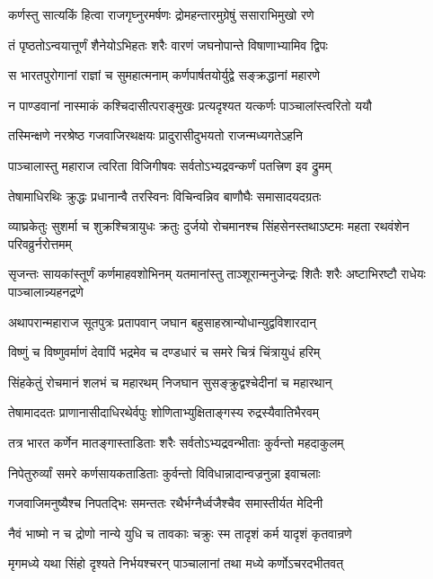 \twolineshloka
{कर्णस्तु सात्यकिं हित्वा राजगृघ्नुरमर्षणः}
{द्रोमहन्तारमुग्रेषुं ससाराभिमुखो रणे}


\twolineshloka
{तं पृष्ठतोऽन्वयात्तूर्णं शैनेयोऽभिहतः शरैः}
{वारणं जघनोपान्ते विषाणाभ्यामिव द्विपः}


\twolineshloka
{स भारतपुरोगानां राज्ञां च सुमहात्मनाम्}
{कर्णपार्षतयोर्युद्वे सङ्क्रद्धानां महारणे}


\twolineshloka
{न पाण्डवानां नास्माकं कश्चिदासीत्पराङ्मुखः}
{प्रत्यदृश्यत यत्कर्णः पाञ्चालांस्त्वरितो ययौ}


\twolineshloka
{तस्मिन्क्षणे नरश्रेष्ठ गजवाजिरथक्षयः}
{प्रादुरासीदुभयतो राजन्मध्यगतेऽहनि}


\twolineshloka
{पाञ्चालास्तु महाराज त्वरिता विजिगीषवः}
{सर्वतोऽभ्यद्रवन्कर्णं पतत्त्रिण इव द्रुमम्}


\twolineshloka
{तेषामाधिरथिः क्रुद्धः प्रधानान्वै तरस्विनः}
{विचिन्वन्निव बाणौघैः समासादयदग्रतः}


\threelineshloka
{व्याघ्रकेतुः सुशर्मा च शुक्रश्चित्रायुधः क्रतुः}
{दुर्जयो रोचमानश्च सिंहसेनस्तथाऽष्टमः}
{महता रथवंशेन परिवव्रुर्नरोत्तमम्}


\threelineshloka
{सृजन्तः सायकांस्तूर्णं कर्णमाहवशोभिनम्}
{यतमानांस्तु ताञ्शूरान्मनुजेन्द्रः शितैः शरैः}
{अष्टाभिरष्टौ राधेयः पाञ्चालान्न्यहनद्रणे}


\twolineshloka
{अथापरान्महाराज सूतपुत्रः प्रतापवान्}
{जघान बहुसाहस्रान्योधान्युद्वविशारदान्}


\twolineshloka
{विष्णुं च विष्णुवर्माणं देवापिं भद्रमेव च}
{दण्डधारं च समरे चित्रं चिंत्रायुधं हरिम्}


\twolineshloka
{सिंहकेतुं रोचमानं शलभं च महारथम्}
{निजघान सुसङ्क्रुद्वश्चेदीनां च महारथान्}


\twolineshloka
{तेषामाददतः प्राणानासीदाधिरथेर्वपुः}
{शोणिताभ्युक्षिताङ्गस्य रुद्रस्यैवातिभैरवम्}


\twolineshloka
{तत्र भारत कर्णेन मातङ्गास्ताडिताः शरैः}
{सर्वतोऽभ्यद्रवन्भीताः कुर्वन्तो महदाकुलम्}


\twolineshloka
{निपेतुरुर्व्यां समरे कर्णसायकताडिताः}
{कुर्वन्तो विविधान्नादान्वज्रनुन्ना इवाचलाः}


\twolineshloka
{गजवाजिमनुष्यैश्च निपतद्भिः समन्ततः}
{रथैर्भग्नैर्ध्वजैश्चैव समास्तीर्यत मेदिनी}


\twolineshloka
{नैवं भाष्मो न च द्रोणो नान्ये युधि च तावकाः}
{चक्रुः स्म तादृशं कर्म यादृशं कृतवान्रणे}


\twolineshloka
{मृगमध्ये यथा सिंहो दृश्यते निर्भयश्चरन्}
{पाञ्चालानां तथा मध्ये कर्णोऽचरदभीतवत्}


